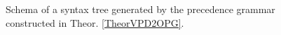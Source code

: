 \documentclass[3p,11pt]{elsarticle}
\begin{document}
\begin{figure}[h!]
\begin{center}
\end{center}
\caption{\label{figureTree}Schema of a syntax tree generated by the precedence grammar constructed in Theor. \ref{TheorVPD2OPG}.}
\end{figure}
\end{document}
